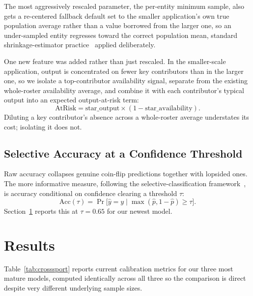 \documentclass[conference]{IEEEtran}
\begin{document}
The most aggressively rescaled parameter, the per-entity minimum
sample, also gets a re-centered fallback default set to the smaller
application's own true population average rather than a value
borrowed from the larger one, so an under-sampled entity regresses
toward the correct population mean, standard shrinkage-estimator
practice~\cite{efronmorris1975,gelmanhill2007} applied deliberately.

One new feature was added rather than just rescaled. In the
smaller-scale application, output is concentrated on fewer key
contributors than in the larger one, so we isolate a top-contributor
availability signal, separate from the existing whole-roster
availability average, and combine it with each contributor's typical
output into an expected output-at-risk term:
\begin{equation}
  \text{AtRisk} = \text{star\_output} \times (1 - \text{star\_availability}).
\label{eq:pts-at-risk}
\end{equation}
Diluting a key contributor's absence across a whole-roster average
understates its cost; isolating it does not.

\subsection{Selective Accuracy at a Confidence Threshold}

Raw accuracy collapses genuine coin-flip predictions together with
lopsided ones. The more informative measure, following the
selective-classification framework~\cite{elyaniv2010}, is accuracy
conditional on confidence clearing a threshold $\tau$:
\begin{equation}
  \text{Acc}(\tau) = \Pr\bigl[\hat{y} = y \mid \max(\hat{p}, 1-\hat{p}) \ge \tau\bigr].
\label{eq:selective}
\end{equation}
Section~\ref{sec:results} reports this at $\tau = 0.65$ for our
newest model.

\section{Results}
\label{sec:results}

Table~\ref{tab:crosssport} reports current calibration metrics for our
three most mature models, computed identically across all three so the
comparison is direct despite very different underlying sample sizes.
\end{document}
